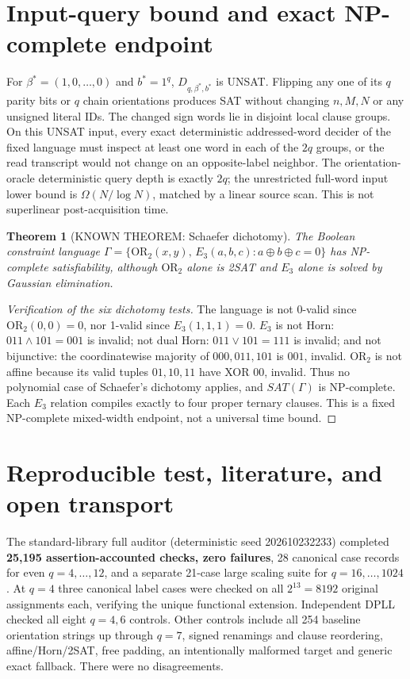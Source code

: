 \documentclass[11pt]{article}
\newtheorem{theorem}{Theorem}
\begin{document}
\section{Input-query bound and exact NP-complete endpoint}
For $\beta^*=(1,0,\ldots,0)$ and $b^*=1^q$,
$D_{q,\beta^*,b^*}$ is UNSAT.
Flipping any one of its $q$ parity bits or $q$ chain orientations
produces SAT without changing $n,M,N$ or any unsigned literal IDs.
The changed sign words lie in disjoint local clause groups.
On this UNSAT input, every exact deterministic addressed-word decider
of the fixed language must inspect at least one word in each of
the $2q$ groups, or the read transcript would not change on an
opposite-label neighbor. The orientation-oracle deterministic query
depth is exactly $2q$; the unrestricted full-word input lower bound
is $\Omega(N/\log N)$, matched by a linear source scan.
This is not superlinear post-acquisition time.

\begin{theorem}[KNOWN THEOREM: Schaefer dichotomy]
The Boolean constraint language
$\Gamma=\{\mathrm{OR}_2(x,y),\,E_3(a,b,c):a\oplus b\oplus c=0\}$
has NP-complete satisfiability, although $\mathrm{OR}_2$ alone is
2SAT and $E_3$ alone is solved by Gaussian elimination.
\end{theorem}
\begin{proof}[Verification of the six dichotomy tests]
The language is not 0-valid since $\mathrm{OR}_2(0,0)=0$,
nor 1-valid since $E_3(1,1,1)=0$.
$E_3$ is not Horn: $011\land101=001$ is invalid;
not dual Horn: $011\lor101=111$ is invalid;
and not bijunctive: the coordinatewise majority of
$000,011,101$ is $001$, invalid.
$\mathrm{OR}_2$ is not affine because its valid tuples
$01,10,11$ have XOR $00$, invalid.
Thus no polynomial case of Schaefer's dichotomy applies,
and $SAT(\Gamma)$ is NP-complete. Each $E_3$ relation compiles
exactly to four proper ternary clauses. This is a fixed
NP-complete mixed-width endpoint, not a universal time bound.
\end{proof}

\section{Reproducible test, literature, and open transport}
The standard-library full auditor (deterministic seed 202610232233)
completed \textbf{25,195 assertion-accounted checks, zero failures},
28 canonical case records for even $q=4,\ldots,12$,
and a separate 21-case large scaling suite for $q=16,\ldots,1024$.
At $q=4$ three canonical label cases were checked on all
$2^{13}=8192$ original assignments each, verifying the unique
functional extension. Independent DPLL checked all eight
$q=4,6$ controls. Other controls include all 254 baseline
orientation strings up through $q=7$, signed renamings and clause
reordering, affine/Horn/2SAT, free padding, an intentionally malformed
target and generic exact fallback. There were no disagreements.
\end{document}

